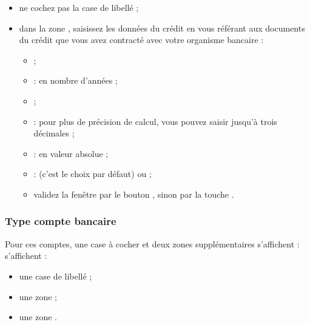 \begin{itemize}
	\item ne cochez pas la case de libellé  ; %
	\item dans la zone , saisissez les données du crédit en vous référant aux documents du crédit que vous avez contracté avec votre organisme bancaire :
		\begin{itemize}
			 \item {} ; 
			 \item {} : en nombre d'années ;
			 \item {} ;
			 \item {} : pour plus de précision de calcul, vous pouvez saisir jusqu'à trois décimales ;
			 \item {} : en valeur absolue ;
			 \item {} :  (c'est le choix par défaut) ou  ;
			 \item validez la fenêtre par le bouton , sinon par la touche .	
		\end{itemize}
\end{itemize}


\subsubsection{Type compte bancaire\label{setup-budget-data-bank}}

Pour ces comptes, une case à cocher et deux zones supplémentaires \ifIllustration s'affichent :
\else s'affichent : 
\fi

\begin{itemize}
	\item une case de libellé  ; 
	\item une zone  ;
	\item une zone .
\end{itemize}

